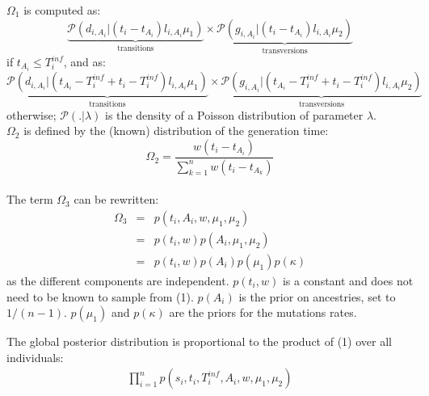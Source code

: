 \documentclass[10pt]{article}
\begin{document}
$\Omega_1$ is computed as: 
$$
\underbrace{\mathcal{P}\left(d_{i,A_i} | (t_i - t_{A_i}) l_{i,A_i} \mu_1 \right)}_{\mbox{transitions}}
\times 
\underbrace{\mathcal{P}\left(g_{i,A_i} | (t_i - t_{A_i}) l_{i,A_i} \mu_2 \right)}_{\mbox{transversions}}
$$
if $t_{A_i} \leq T_i^{inf} $, and as:
$$
\underbrace{\mathcal{P}\left(d_{i,A_i} | (t_{A_i} - T_i^{inf} + t_i - T_i^{inf}) l_{i,A_i} \mu_1 \right)}_{\mbox{transitions}}
\times 
\underbrace{\mathcal{P}\left(g_{i,A_i} | (t_{A_i} - T_i^{inf} + t_i - T_i^{inf}) l_{i,A_i} \mu_2 \right)}_{\mbox{transversions}}
$$
otherwise; $\mathcal{P}(. | \lambda)$ is the density of a Poisson distribution of parameter $\lambda$.
~\\





$\Omega_2$ is defined by the (known) distribution of the generation time:
$$
\Omega_2 = \frac{w(t_i - t_{A_i})}{\sum_{k=1}^n w(t_i - t_{A_k})} 
$$
~\\



The term $\Omega_3$ can be rewritten:
\begin{eqnarray}
\Omega_3 &=&  p(t_i, A_i, w, \mu_1, \mu_2) \\
	 &=&  p(t_i, w) p(A_i, \mu_1, \mu_2) \\
	 &=&  p(t_i, w) p(A_i) p(\mu_1) p(\kappa) 
\end{eqnarray}
as the different components are independent.
$p(t_i, w)$ is a constant and does not need to be known to sample from (1).
$p(A_i)$ is the prior on ancestries, set to $1/(n-1)$.
$ p(\mu_1)$ and $p(\kappa)$ are the priors for the mutations rates.

The global posterior distribution is proportional to the product of (1) over all individuals:
\begin{eqnarray}
\prod_{i=1}^n p(s_i, t_i, T_i^{inf}, A_i, w, \mu_1, \mu_2)
\end{eqnarray}
\end{document}
